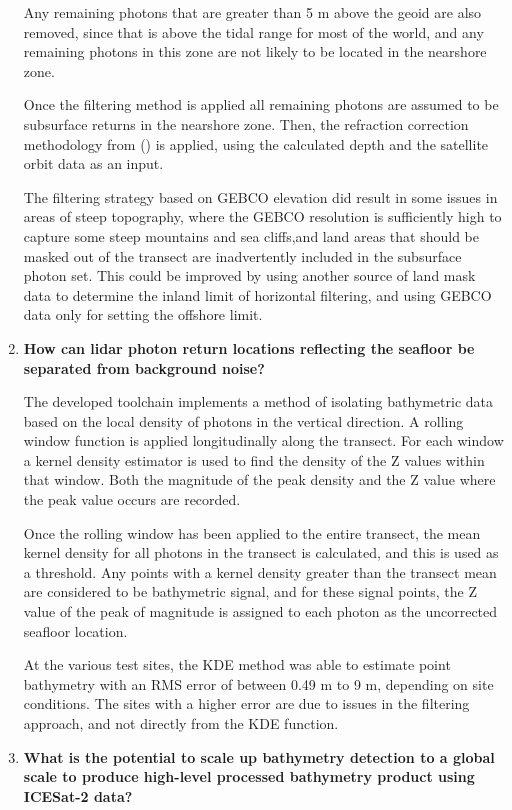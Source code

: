 \begin{enumerate}
    Any remaining photons that are greater than 5 m above the geoid are also removed, since that is above the tidal range for most of the world, and any remaining photons in this zone are not likely to be located in the nearshore zone. 

    Once the filtering method is applied all remaining photons are assumed to be subsurface returns in the nearshore zone. Then, the refraction correction methodology from \citeauthor{Parrish2019}(\citeyear{Parrish2019}) is applied, using the calculated depth and the satellite orbit data as an input. 

    The filtering strategy based on GEBCO elevation did result in some issues in areas of steep topography, where the GEBCO resolution is sufficiently high to capture some steep mountains and sea cliffs,and land areas that should be masked out of the transect are inadvertently included in the subsurface photon set. This could be improved by using another source of land mask data to determine the inland limit of horizontal filtering, and using GEBCO data only for setting the offshore limit.

    \item \textbf{How can lidar photon return locations reflecting the seafloor be separated from background noise?}
    
    The developed toolchain implements a method of isolating bathymetric data based on the local density of photons in the vertical direction. A rolling window function is applied longitudinally along the transect. For each window a kernel density estimator is used to find the density of the Z values within that window. Both the magnitude of the peak density and the Z value where the peak value occurs are recorded.    
    
    Once the rolling window has been applied to the entire transect, the mean kernel density for all photons in the transect is calculated, and this is used as a threshold. Any points with a kernel density greater than the transect mean are considered to be bathymetric signal, and for these signal points, the Z value of the peak of magnitude is assigned to each photon as the uncorrected seafloor location. 
    
    At the various test sites, the KDE method was able to estimate point bathymetry with an RMS error of between 0.49 m to 9 m, depending on site conditions. The sites with a higher error are due to issues in the filtering approach, and not directly from the KDE function.
    \item \textbf{What is the potential to scale up bathymetry detection to a global scale to produce high-level processed bathymetry product using ICESat-2 data? } 
    

\end{enumerate}
